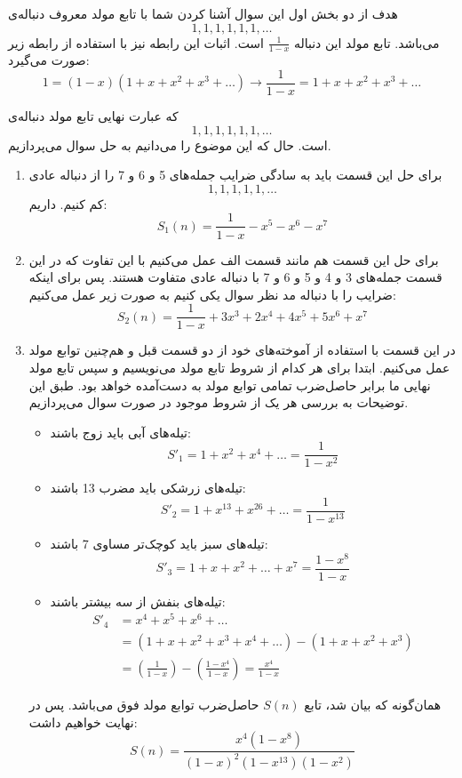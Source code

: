     \p
    هدف از دو بخش اول این سوال آشنا کردن شما با تابع مولد معروف دنباله‌ی 
        $${1,1,1,1,1,1,\ldots}$$
        می‌باشد.
        تابع مولد این دنباله $\frac{1}{1-x}$ است. اثبات این رابطه نیز با استفاده از رابطه زیر صورت می‌گیرد:
        $$1 = (1-x)(1+x+x^2+x^3+\ldots) \rightarrow \frac{1}{1-x} = 1+x+x^2+x^3+\ldots$$
        
        که عبارت نهایی تابع مولد دنباله‌ی 
        $${1,1,1,1,1,1,\ldots}$$
        است.
        حال که این موضوع را می‌دانیم به حل سوال می‌پردازیم.
        \begin{enumerate}
            \item 
            برای حل این قسمت باید به سادگی ضرایب جمله‌های 5 و 6 و 7 را از دنباله عادی
            $${1,1,1,1,1,\ldots}$$
            کم کنیم. داریم:
            $$S_{1}(n) = \frac{1}{1-x} - x^5 - x^6 - x^7$$
            \item
            برای حل این قسمت هم مانند قسمت الف عمل می‌کنیم با این تفاوت که در این قسمت جمله‌های 3 و 4 و 5 و 6 و 7 با دنباله عادی متفاوت هستند. پس برای اینکه ضرایب را با دنباله مد نظر سوال یکی کنیم به صورت زیر عمل می‌کنیم:
            $$S_{2}(n) = \frac{1}{1-x} + 3x^3 + 2x^4 + 4x^5 + 5x^6 + x^7$$
        \item
        در این قسمت با استفاده از آموخته‌های خود از دو قسمت قبل و هم‌چنین توابع مولد عمل می‌کنیم. ابتدا برای هر کدام از شروط تابع مولد می‌نویسیم و سپس تابع مولد نهایی ما برابر حاصل‌ضرب تمامی  توابع مولد  به دست‌آمده خواهد بود.
        طبق این توضیحات به بررسی هر یک از شروط موجود در صورت سوال می‌پردازیم.
        \begin{itemize}
            \item 
            تیله‌های آبی باید زوج باشند:
            $$S'_{1} = 1 + x^2 + x^4 + \ldots = \frac{1}{1-x^2}$$
            \item
            تیله‌های زرشکی باید مضرب 13 باشند:
            $$S'_{2} = 1 + x^{13} + x^{26} + \ldots = \frac{1}{1-x^{13}}$$
            \item
            تیله‌های سبز باید کوچک‌تر مساوی 7 باشند:
            $$S'_{3} = 1 + x + x^2 + \ldots + x^7 = \frac{1-x^8}{1-x}$$
            \item
            تیله‌های بنفش از سه بیشتر باشند:
            \begin{align*}
            S'_{4} &= x^4 + x^5 + x^6 + \ldots\\
            &= (1+x+x^2+x^3+x^4+\ldots) - (1 + x + x^2 + x^3)\\
            &= (\frac{1}{1-x}) - (\frac{1-x^4}{1-x}) = \frac{x^4}{1-x}
            \end{align*}
        \end{itemize}
        همان‌گونه که بیان شد، تابع 
        $S(n)$
        حاصل‌ضرب توابع مولد فوق می‌باشد. پس در نهایت خواهیم داشت:
        $$S(n) = \frac{x^4(1-x^8)}{(1-x)^2(1-x^{13})(1-x^{2})}$$
        \end{enumerate}
